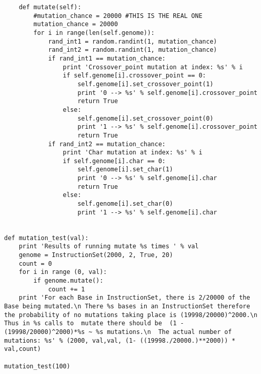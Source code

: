 \documentclass[a4paper]{article}
\begin{document}
\begin{enumerate}
\begin{verbatim}
    def mutate(self):
        #mutation_chance = 20000 #THIS IS THE REAL ONE
        mutation_chance = 20000
        for i in range(len(self.genome)):
            rand_int1 = random.randint(1, mutation_chance)
            rand_int2 = random.randint(1, mutation_chance)
            if rand_int1 == mutation_chance:
                print 'Crossover_point mutation at index: %s' % i
                if self.genome[i].crossover_point == 0:
                    self.genome[i].set_crossover_point(1)
                    print '0 --> %s' % self.genome[i].crossover_point
                    return True
                else:
                    self.genome[i].set_crossover_point(0)
                    print '1 --> %s' % self.genome[i].crossover_point
                    return True
            if rand_int2 == mutation_chance:
                print 'Char mutation at index: %s' % i
                if self.genome[i].char == 0:
                    self.genome[i].set_char(1)
                    print '0 --> %s' % self.genome[i].char
                    return True
                else:
                    self.genome[i].set_char(0) 
                    print '1 --> %s' % self.genome[i].char


def mutation_test(val):
    print 'Results of running mutate %s times ' % val
    genome = InstructionSet(2000, 2, True, 20)
    count = 0
    for i in range (0, val):
        if genome.mutate():
            count += 1
    print 'For each Base in InstructionSet, there is 2/20000 of the Base being mutated.\n There %s bases in an InstructionSet therefore the probability of no mutations taking place is (19998/20000)^2000.\n Thus in %s calls to  mutate there should be  (1 - (19998/20000)^2000)*%s ~ %s mutations.\n  The actual number of mutations: %s' % (2000, val,val, (1- ((19998./20000.)**2000)) * val,count)

mutation_test(100)
\end{verbatim}
\end{enumerate}
\end{document}
